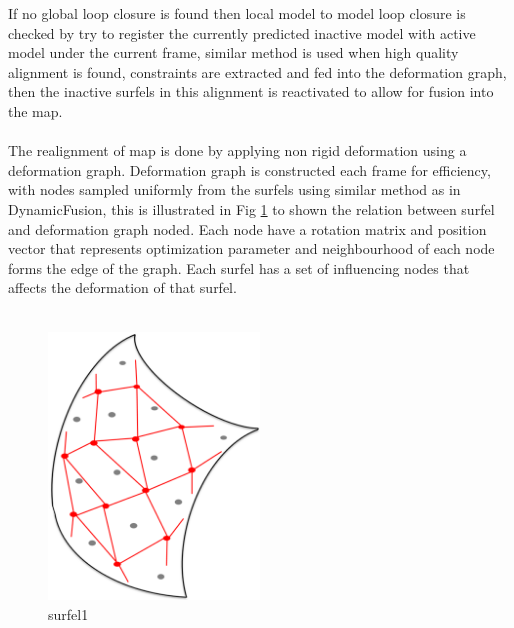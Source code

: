 \documentclass[12pt,twoside]{article}
\begin{document}
If no global loop closure is found then local model to model loop closure is checked by try to register the currently predicted inactive model with active model under the current frame, similar method is used when high quality alignment is found, constraints are extracted and fed into  the deformation graph, then the inactive surfels in this alignment is reactivated to allow for fusion into the map.\\
\\
The realignment of map is done by applying non rigid deformation using a deformation graph. Deformation graph  is constructed each frame for efficiency, with nodes sampled uniformly from the surfels using similar method as in DynamicFusion\citep{newcombe2015dynamicfusion}, this is illustrated in Fig \ref{fig:surfel1} to shown the relation between surfel and deformation graph noded. Each node have a rotation matrix and position vector that represents optimization parameter and neighbourhood of each node forms the edge of the graph. Each surfel has a set of influencing nodes that affects the deformation of that surfel.\\
\\
\begin{figure}[h]
    \centering
    \includegraphics[width=0.5\textwidth]{figures/surfel1}
    \caption{surfel1}
    \label{fig:surfel1}
\end{figure}
\end{document}
